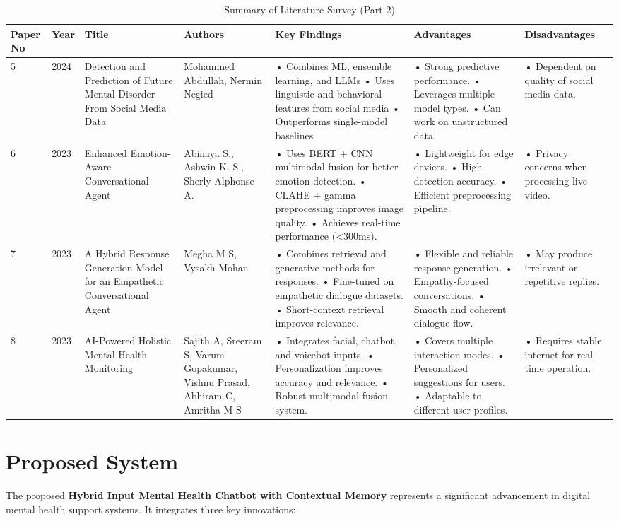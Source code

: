 \documentclass[11pt]{report}
\begin{document}
\begin{table}[H]
\centering
\caption{Summary of Literature Survey (Part 2)}
\label{tab:literature_survey_2}
\hspace*{-0.5cm}
\begin{tabular}{|p{0.8cm}|p{0.8cm}|p{2.8cm}|p{2.5cm}|p{3.2cm}|p{2.5cm}|p{2.2cm}|}
\hline
Paper No & Year & Title & Authors & Key Findings & Advantages & Disadvantages \\ 
\hline
5 & 2024 & Detection and Prediction of Future Mental Disorder From Social Media Data & Mohammed Abdullah, Nermin Negied & • Combines ML, ensemble learning, and LLMs
• Uses linguistic and behavioral features from social media
• Outperforms single-model baselines & • Strong predictive performance.
• Leverages multiple model types.
• Can work on unstructured data. & • Dependent on quality of social media data. \\ 
\hline
6 & 2023 & Enhanced Emotion-Aware Conversational Agent & Abinaya S., Ashwin K. S., Sherly Alphonse A. & • Uses BERT + CNN multimodal fusion for better emotion detection.
• CLAHE + gamma preprocessing improves image quality.
• Achieves real-time performance (<300ms). & • Lightweight for edge devices.
• High detection accuracy.
• Efficient preprocessing pipeline. & • Privacy concerns when processing live video. \\ 
\hline
7 & 2023 & A Hybrid Response Generation Model for an Empathetic Conversational Agent & Megha M S, Vysakh Mohan & • Combines retrieval and generative methods for responses.
• Fine-tuned on empathetic dialogue datasets.
• Short-context retrieval improves relevance. & • Flexible and reliable response generation.
• Empathy-focused conversations.
• Smooth and coherent dialogue flow. & • May produce irrelevant or repetitive replies. \\ 
\hline
8 & 2023 & AI-Powered Holistic Mental Health Monitoring & Sajith A, Sreeram S, Varum Gopakumar, Vishnu Prasad, Abhiram C, Amritha M S & • Integrates facial, chatbot, and voicebot inputs.
• Personalization improves accuracy and relevance.
• Robust multimodal fusion system. & • Covers multiple interaction modes.
• Personalized suggestions for users.
• Adaptable to different user profiles. & • Requires stable internet for real-time operation. \\ 
\hline
\end{tabular}
\end{table}

\newpage
\section{Proposed System}
The proposed \textbf{Hybrid Input Mental Health Chatbot with Contextual Memory} represents a significant advancement in digital mental health support systems. It integrates three key innovations:
\end{document}

